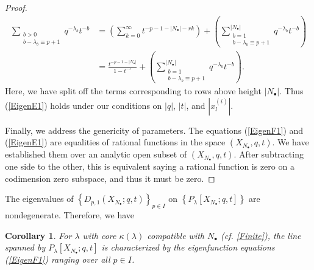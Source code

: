 \documentclass{amsart}
\newcommand{\kb}{\kappa}
\newtheorem{cor}[thm]{Corollary}
\theoremstyle{remark}
\numberwithin{thm}{section}
\numberwithin{equation}{section}
\begin{document}
\begin{proof}
\begin{equation}
 \begin{aligned}
 \sum_{\substack{b>0\\ b-\lambda_b\equiv p+1}}
q^{-\lambda_b}t^{-b}
&=
\left(\sum_{k=0}^\infty t^{-p-1-|N_\bullet|-rk}\right)+
\left(\sum_{\substack{b=1\\ b-\lambda_b\equiv p+1}}^{|N_\bullet|}
q^{-\lambda_b}t^{-b}\right)\\
&=\frac{t^{-p-1-|N_\bullet|}}{1-t^{-r}}+\left(\sum_{\substack{b=1\\ b-\lambda_b\equiv p+1}}^{|N_\bullet|}
q^{-\lambda_b}t^{-b}\right).   
\end{aligned} 
\label{eigenTail}
\end{equation}
Here, we have split off the terms corresponding to rows above height $|N_\bullet|$.
Thus (\ref{EigenE1}) holds under our conditions on $|q|$, $|t|$, and $|x_{l}^{(i)}|$.

Finally, we address the genericity of parameters.
The equations (\ref{EigenF1}) and (\ref{EigenE1}) are equalities of rational functions in the space $(X_{N_\bullet}, q,t)$.
We have established them over an analytic open subset of $(X_{N_\bullet}, q,t)$.
After subtracting one side to the other, this is equivalent saying a rational function is zero on a codimension zero subspace, and thus it must be zero.
\end{proof}

\noindent
The eigenvalues of $\left\{ D_{p,1}(X_{N_\bullet};q,t) \right\}_{p\in I}$ on $\left\{ P_\lambda[X_{N_\bullet};q,t] \right\}$ are nondegenerate.
Therefore, we have
\begin{cor}\label{CharCor}
For $\lambda$ with core $\kb(\lambda)$ compatible with $N_\bullet$ (cf. \ref{Finite}), the line spanned by $P_\lambda[X_{N_\bullet};q,t]$ is characterized by the eigenfunction equations (\ref{EigenF1}) ranging over all $p\in I$.
\end{cor}
\end{document}
